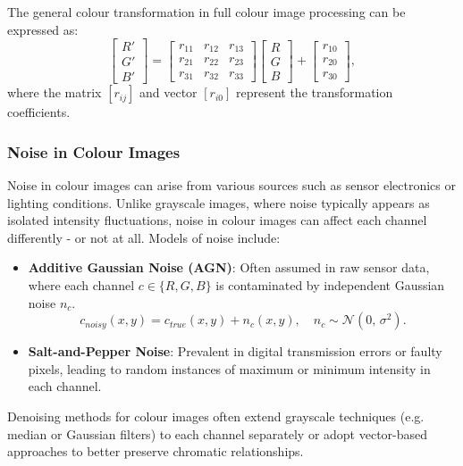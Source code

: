 \documentclass[a4paper,12pt]{article}
\begin{document}
The general colour transformation in full colour image processing can be expressed as:
\[
\begin{bmatrix}
R' \\
G' \\
B'
\end{bmatrix}
=
\begin{bmatrix}
r_{11} & r_{12} & r_{13} \\
r_{21} & r_{22} & r_{23} \\
r_{31} & r_{32} & r_{33}
\end{bmatrix}
\begin{bmatrix}
R \\
G \\
B
\end{bmatrix}
+
\begin{bmatrix}
r_{10} \\
r_{20} \\
r_{30}
\end{bmatrix},
\]
where the matrix \([r_{ij}]\) and vector \([r_{i0}]\) represent the transformation coefficients.

\subsubsection{Noise in Colour Images}

Noise in colour images can arise from various sources such as sensor electronics or lighting conditions. Unlike grayscale images, where noise typically appears as isolated intensity fluctuations, noise in colour images can affect each channel differently - or not at all. Models of noise include:

\begin{itemize}
    \item \textbf{Additive Gaussian Noise (AGN)}: Often assumed in raw sensor data, where each channel \(c \in \{R, G, B\}\) is contaminated by independent Gaussian noise \(n_c\).
    \[
    c_{noisy}(x,y) = c_{true}(x,y) + n_c(x,y), \quad n_c \sim \mathcal{N}(0,\,\sigma^2).
    \]
    \item \textbf{Salt-and-Pepper Noise}: Prevalent in digital transmission errors or faulty pixels, leading to random instances of maximum or minimum intensity in each channel.
\end{itemize}

Denoising methods for colour images often extend grayscale techniques (e.g. median or Gaussian filters) to each channel separately or adopt vector-based approaches to better preserve chromatic relationships.
\end{document}
